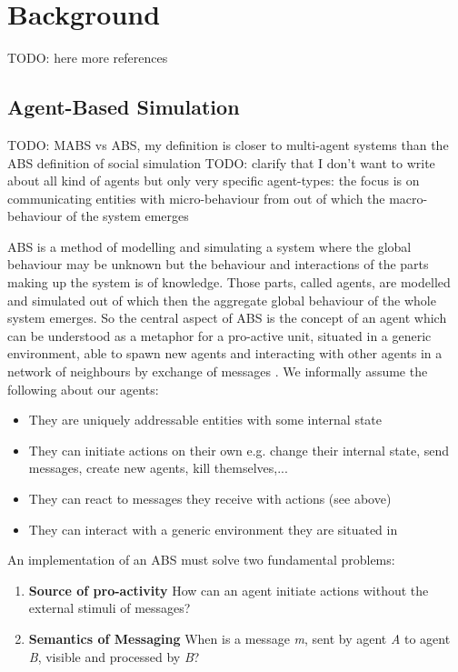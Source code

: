 \section{Background}
TODO: here more references

\subsection{Agent-Based Simulation}
TODO: MABS vs ABS, my definition is closer to multi-agent systems than the ABS definition of social simulation
TODO: clarify that I don't want to write about all kind of agents but only very specific agent-types: the focus is on communicating entities with micro-behaviour from out of which the macro-behaviour of the system emerges

ABS is a method of modelling and simulating a system where the global behaviour may be unknown but the behaviour and interactions of the parts making up the system is of knowledge. Those parts, called agents, are modelled and simulated out of which then the aggregate global behaviour of the whole system emerges. So the central aspect of ABS is the concept of an agent which can be understood as a metaphor for a pro-active unit, situated in a generic environment, able to spawn new agents and interacting with other agents in a network of neighbours by exchange of messages \cite{wooldridge_introduction_2009}. We informally assume the following about our agents:

\begin{itemize}
	\item They are uniquely addressable entities with some internal state
	\item They can initiate actions on their own e.g. change their internal state, send messages, create new agents, kill themselves,...
	\item They can react to messages they receive with actions (see above)
	\item They can interact with a generic environment they are situated in
\end{itemize} 

An implementation of an ABS must solve two fundamental problems:

\begin{enumerate}
	\item \textbf{Source of pro-activity} How can an agent initiate actions without the external stimuli of messages?
	\item \textbf{Semantics of Messaging} When is a message \textit{m}, sent by agent \textit{A} to agent \textit{B}, visible and processed by \textit{B}?
\end{enumerate}

